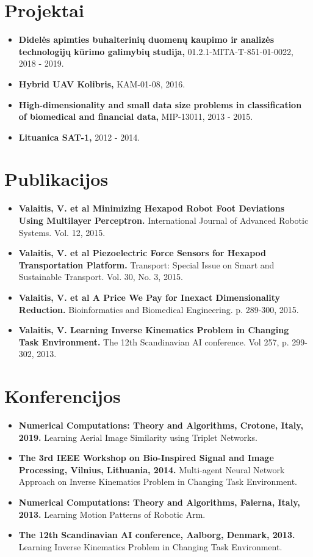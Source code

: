 \documentclass[letterpaper,11pt]{report}
\newcommand{\resumeItem}[2]{
  \item\small{
    \textbf{#1}{ #2 \vspace{-2pt}}
  }
}
\newcommand{\resumeSubItem}[2]{\resumeItem{#1}{#2}\vspace{-4pt}}
\newcommand{\resumeSubHeadingListStart}{\begin{itemize}[leftmargin=*] \renewcommand\labelitemi{$\circ$}}
\newcommand{\resumeSubHeadingListEnd}{\end{itemize}}
\begin{document}
\section{Projektai}
  \resumeSubHeadingListStart
    \resumeSubItem{Didelės apimties buhalterinių duomenų kaupimo ir analizės technologijų kūrimo galimybių studija,}{01.2.1-MITA-T-851-01-0022, 2018 - 2019.}
    \resumeSubItem{Hybrid UAV Kolibris,}{KAM-01-08, 2016.}
    \resumeSubItem{High-dimensionality and small data size problems in classification of biomedical and financial data,}{MIP-13011, 2013 - 2015.}
    \resumeSubItem{Lituanica SAT-1,}{2012 - 2014.}
  \resumeSubHeadingListEnd

\section{Publikacijos}
    \resumeSubHeadingListStart
    \resumeSubItem{Valaitis, V. et al Minimizing Hexapod Robot Foot Deviations Using Multilayer Perceptron.}{International Journal of Advanced Robotic Systems. Vol. 12, 2015.}
    \resumeSubItem{Valaitis, V. et al Piezoelectric Force Sensors for Hexapod Transportation Platform.}{Transport: Special Issue on Smart and Sustainable Transport. Vol. 30, No. 3, 2015.}
    \resumeSubItem{Valaitis, V. et al A Price We Pay for Inexact Dimensionality Reduction.}{Bioinformatics and Biomedical Engineering. p. 289-300, 2015.}
    \resumeSubItem{Valaitis, V. Learning Inverse Kinematics Problem in Changing Task Environment.}{The 12th Scandinavian AI conference. Vol 257, p. 299-302, 2013.}
  \resumeSubHeadingListEnd

\section{Konferencijos}
  \resumeSubHeadingListStart
    \resumeSubItem{Numerical Computations: Theory and Algorithms, Crotone, Italy, 2019.}{Learning Aerial Image Similarity using Triplet Networks.}
    \resumeSubItem{The 3rd IEEE Workshop  on Bio-Inspired Signal and Image Processing, Vilnius, Lithuania, 2014.}{Multi-agent Neural Network Approach on Inverse Kinematics Problem in Changing Task Environment.}
    \resumeSubItem{Numerical Computations: Theory and Algorithms, Falerna, Italy, 2013.}{Learning Motion Patterns of Robotic Arm.}
    \resumeSubItem{The 12th Scandinavian AI conference, Aalborg, Denmark, 2013.}{Learning Inverse Kinematics Problem in Changing Task Environment.}
  \resumeSubHeadingListEnd
\end{document}
